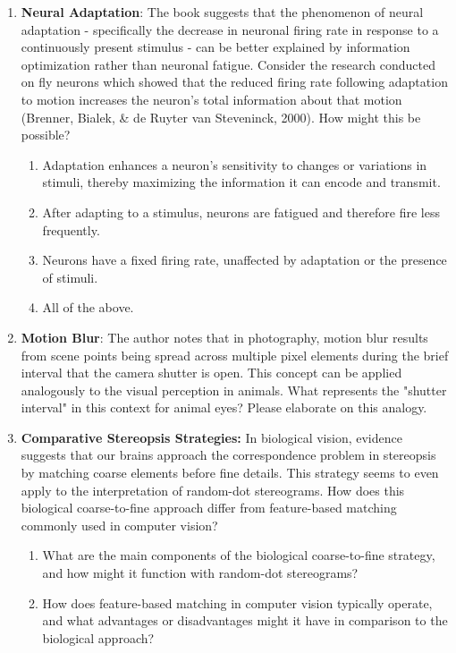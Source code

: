 \documentclass[11pt,letterpaper]{article}
\begin{document}
\begin{enumerate}
    \item \textbf{Neural Adaptation}: The book suggests that the phenomenon of neural adaptation - specifically the decrease in neuronal firing rate in response to a continuously present stimulus - can be better explained by information optimization rather than neuronal fatigue. Consider the research conducted on fly neurons which showed that the reduced firing rate following adaptation to motion increases the neuron's total information about that motion (Brenner, Bialek, \& de Ruyter van Steveninck, 2000). How might this be possible?
    \begin{enumerate}
        \item Adaptation enhances a neuron's sensitivity to changes or variations in stimuli, thereby maximizing the information it can encode and transmit.
        \item After adapting to a stimulus, neurons are fatigued and therefore fire less frequently.
        \item Neurons have a fixed firing rate, unaffected by adaptation or the presence of stimuli.
        \item All of the above.
    \end{enumerate}

    \item \textbf{Motion Blur}: The author notes that in photography, motion blur results from scene points being spread across multiple pixel elements during the brief interval that the camera shutter is open. This concept can be applied analogously to the visual perception in animals. What represents the "shutter interval" in this context for animal eyes? Please elaborate on this analogy.
    \pagebreak

    \item \textbf{Comparative Stereopsis Strategies:} In biological vision, evidence suggests that our brains approach the correspondence problem in stereopsis by matching coarse elements before fine details. This strategy seems to even apply to the interpretation of random-dot stereograms. How does this biological coarse-to-fine approach differ from feature-based matching commonly used in computer vision?
    \begin{enumerate}
        \item What are the main components of the biological coarse-to-fine strategy, and how might it function with random-dot stereograms?
        \vspace{3 cm}
        \item How does feature-based matching in computer vision typically operate, and what advantages or disadvantages might it have in comparison to the biological approach?
        \vspace{3 cm}
    \end{enumerate}


\end{enumerate}
\end{document}
